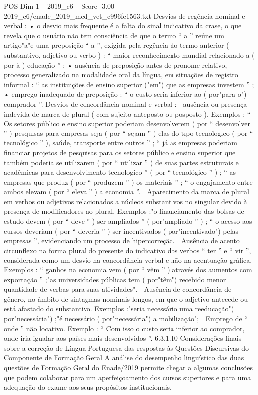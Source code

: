 \begin{textsample}{POS Dim 1 – 2019\_c6 – Score -3.00 – 2019\_c6/enade\_2019\_med\_vet\_c996fe1563.txt}
Desvios de regência nominal e verbal : • o desvio mais frequente é a falta do sinal indicativo da crase, o que revela que o usuário não tem consciência de que o termo “ a ” reúne um artigo"a"e uma preposição “ a ”, exigida pela regência do termo anterior ( substantivo, adjetivo ou verbo ) : “ maior reconhecimento mundial relacionado a ( por à ) educação ” ; • ausência de preposição antes de pronome relativo, processo generalizado na modalidade oral da língua, em situações de registro informal : “ as instituições de ensino superior ("em") que as empresas investem ” ; • emprego inadequado de preposição : “ o custo seria inferior ao ( por"para o") comprador ”.
Desvios de concordância nominal e verbal :  ausência ou presença indevida de marca de plural ( com sujeito anteposto ou posposto ).
Exemplos : “ Os setores público e ensino superior poderiam desenvolverem ( por “ desenvolver ” ) pesquisas para empresas seja ( por “ sejam ” ) elas do tipo tecnologico ( por “ tecnológico ” ), saúde, transporte entre outros ” ; “ já as empresas poderiam financiar projetos de pesquisas para os setores público e ensino superior que também poderia se utilizarem ( por “ utilizar ” ) de suas partes estruturais e acadêmicas para desenvolvimento tecnologico ” ( por “ tecnológico ” ) ; “ as empresas que produz ( por “ produzem ” ) os materiais ” ; “ o engajamento entre ambos elevam ( por “ eleva ” ) a economia ”.  Aparecimento da marca de plural em verbos ou adjetivos relacionados a núcleos substantivos no singular devido à presença de modificadores no plural.
Exemplos :"o financiamento das bolsas de estudo devem ( por “ deve ” ) ser ampliados ” ( por"ampliado ” ) ; “ o acesso aos cursos deveriam ( por “ deveria ” ) ser incentivados ( por"incentivado") pelas empresas ”, evidenciando um processo de hipercorreção.  Ausência de acento circunflexo na forma plural do presente do indicativo dos verbos “ ter ” e “ vir ”, considerada como um desvio na concordância verbal e não na acentuação gráfica.
Exemplos : “ ganhos na economia vem ( por “ vêm ” ) através dos aumentos com exportação ” ;"as universidades públicas tem ( por"têm") recebido menor quantidade de verbas para suas atividades".  Ausência de concordância de gênero, no âmbito de sintagmas nominais longos, em que o adjetivo antecede ou está afastado do substantivo.
Exemplos :"seria necessário uma reeducação"( por"necessária") ;"é necessário ( por"necessária") a mobilização";  Emprego de “ onde ” não locativo.
Exemplo : “ Com isso o custo seria inferior ao comprador, onde iria igualar aos países mais desenvolvidos ”. 6.3.1.10 Considerações finais sobre a correção de Língua Portuguesa das respostas às Questões Discursivas do Componente de Formação Geral A análise do desempenho linguístico das duas questões de Formação Geral do Enade/2019 permite chegar a algumas conclusões que podem colaborar para um aperfeiçoamento dos cursos superiores e para uma adequação do exame aos seus propósitos institucionais.

\end{textsample}
